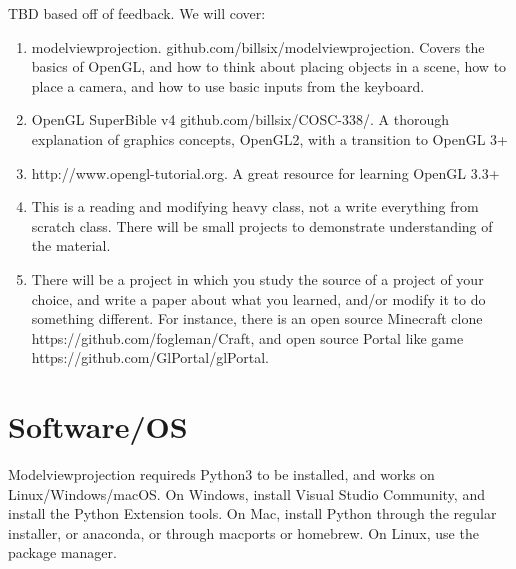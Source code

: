 \documentclass[11pt,twocolumn]{article}
\begin{document}
TBD based off of feedback.  We will cover:


\begin{enumerate}
\item{modelviewprojection. github.com/billsix/modelviewprojection.  Covers the basics of
  OpenGL, and how to think about placing objects in a scene, how to place a camera, and
how to use basic inputs from the keyboard.}
\item{OpenGL SuperBible v4 github.com/billsix/COSC-338/.  A thorough explanation of graphics
concepts, OpenGL2, with a transition to OpenGL 3+}
\item{http://www.opengl-tutorial.org. A great resource for learning OpenGL 3.3+}
\item{This is a reading and modifying heavy class, not a write everything from scratch class.
  There will be small projects to demonstrate understanding of the material.}
\item{There will be a project in which you study the source of a project of your choice,
  and write a paper about what you learned, and/or modify it to do something different.
  For instance, there is an open source Minecraft clone
  https://github.com/fogleman/Craft, and open source Portal like game https://github.com/GlPortal/glPortal.
  }

\end{enumerate}

\section{Software/OS}


Modelviewprojection requireds Python3 to be installed, and works on Linux/Windows/macOS.
On Windows, install Visual Studio Community, and install the Python Extension tools.
On Mac, install Python through the regular installer, or anaconda, or through macports or homebrew.
On Linux, use the package manager.
\end{document}
